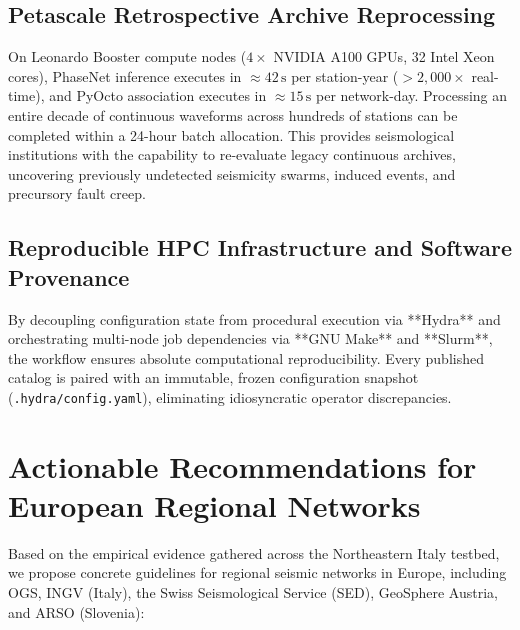\subsection{Petascale Retrospective Archive Reprocessing}
On Leonardo Booster compute nodes ($4\times$ NVIDIA A100 GPUs, 32 Intel Xeon cores), PhaseNet inference executes in $\approx 42\,\unit{\second}$ per station-year ($> 2{,}000\times$ real-time), and PyOcto association executes in $\approx 15\,\unit{\second}$ per network-day. Processing an entire decade of continuous waveforms across hundreds of stations can be completed within a 24-hour batch allocation. This provides seismological institutions with the capability to re-evaluate legacy continuous archives, uncovering previously undetected seismicity swarms, induced events, and precursory fault creep.

\subsection{Reproducible HPC Infrastructure and Software Provenance}
By decoupling configuration state from procedural execution via **Hydra** and orchestrating multi-node job dependencies via **GNU Make** and **Slurm**, the workflow ensures absolute computational reproducibility. Every published catalog is paired with an immutable, frozen configuration snapshot (\texttt{.hydra/config.yaml}), eliminating idiosyncratic operator discrepancies.

\section{Actionable Recommendations for European Regional Networks}
\label{sec:conclusion_recommendations}

Based on the empirical evidence gathered across the Northeastern Italy testbed, we propose concrete guidelines for regional seismic networks in Europe, including \ac{OGS}, \ac{INGV} (Italy), the Swiss Seismological Service (\ac{SED}), GeoSphere Austria, and \ac{ARSO} (Slovenia):

